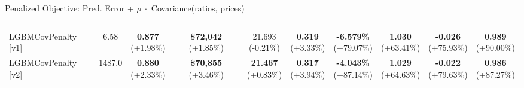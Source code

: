 \documentclass[aspectratio=169,10pt]{beamer}
\begin{document}
\begin{frame}{\frameF}
\begin{block}{{\color{blue}Penalized Objective:} Pred. Error + $\rho\; \cdot$  Covariance(ratios, prices)}
\begin{table}[]
{\begin{tabular}{lc|cc|cc|cccc}
LGBMCovPenalty [v1] & 6.58 &
\makecell{\textbf{0.877}\\{\scriptsize(\textcolor{green!60!black}{+1.98\%})}} &
\makecell{\textbf{\$72,042}\\{\scriptsize(\textcolor{green!60!black}{+1.85\%})}} &
\makecell{21.693\\{\scriptsize(\textcolor{red!70!black}{-0.21\%})}} &
\makecell{\textbf{0.319}\\{\scriptsize(\textcolor{green!60!black}{+3.33\%})}} &
\makecell{\textbf{-6.579\%}\\{\scriptsize(\textcolor{green!60!black}{+79.07\%})}} &
\makecell{\textbf{1.030}\\{\scriptsize(\textcolor{green!60!black}{+63.41\%})}} &
\makecell{\textbf{-0.026}\\{\scriptsize(\textcolor{green!60!black}{+75.93\%})}} &
\makecell{\textbf{0.989}\\{\scriptsize(\textcolor{green!60!black}{+90.00\%})}} \\
[1.5mm]

LGBMCovPenalty [v2] & 1487.0 &
\makecell{\textbf{0.880}\\{\scriptsize(\textcolor{green!60!black}{+2.33\%})}} &
\makecell{\textbf{\$70,855}\\{\scriptsize(\textcolor{green!60!black}{+3.46\%})}} &
\makecell{\textbf{21.467}\\{\scriptsize(\textcolor{green!60!black}{+0.83\%})}} &
\makecell{\textbf{0.317}\\{\scriptsize(\textcolor{green!60!black}{+3.94\%})}} &
\makecell{\textbf{-4.043\%}\\{\scriptsize(\textcolor{green!60!black}{+87.14\%})}} &
\makecell{\textbf{1.029}\\{\scriptsize(\textcolor{green!60!black}{+64.63\%})}} &
\makecell{\textbf{-0.022}\\{\scriptsize(\textcolor{green!60!black}{+79.63\%})}} &
\makecell{\textbf{0.986}\\{\scriptsize(\textcolor{green!60!black}{+87.27\%})}} \\
\bottomrule
\end{tabular}
}
\vspace{-1mm}
\caption{\captionF}
\vspace{-5mm}
\end{table}
\end{block}



\end{frame}
\end{document}
